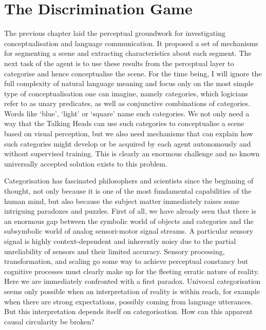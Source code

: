 \chapter{The Discrimination Game}
\label{chap:4}

The previous chapter laid the perceptual groundwork 
for investigating conceptualisation and language 
communication. It proposed a set of mechanisms for segmenting a 
scene and extracting characteristics about each 
segment. The next task of the agent is to use these results
from the perceptual layer to categorise 
and hence conceptualise the
scene. For the time being, I will 
ignore the full complexity of natural
language meaning and focus only on the most 
simple type of conceptualisation one can
imagine, namely categories, which logicians refer 
to as unary predicates, as well as conjunctive 
combinations of categories. Words like `blue', `light' or
`square' name such categories. We not only need a way 
that the Talking Heads can use such categories to conceptualise
a scene based on visual perception, but we also need 
mechanisms that can explain how such categories might 
develop or be acquired by each agent autonomously and 
without supervised training. This is clearly an enormous
challenge and no known universally accepted solution 
exists to this problem.

Categorisation has fascinated philosophers and scientists
since the beginning of thought, not only because it is one
of the most fundamental capabilities of the human mind, 
but also because the subject matter immediately raises 
some intriguing paradoxes and puzzles. First of all, 
we have already seen that there is an enormous 
gap between the symbolic world of objects and categories
and the subsymbolic world of analog sensori-motor signal streams. 
A particular sensory signal is highly context-dependent and
inherently noisy due to the partial
unreliability of sensors and their limited accuracy. 
Sensory processing, transformation, and scaling 
go some way to achieve perceptual constancy
but cognitive processes must clearly make up for
the fleeting erratic nature of reality. 
Here we are immediately confronted with a first paradox. 
Univocal categorisation seems only possible when 
an interpretation of reality is within reach, for example
when there are strong expectations, possibly coming 
from language utterances. But this interpretation
depends itself on categorisation. How can this apparent
causal circularity be broken? 

